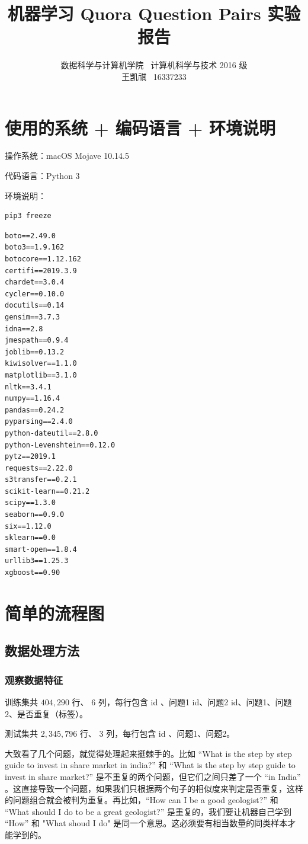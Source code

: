 \documentclass{article}
\begin{document}
\title{机器学习 Quora Question Pairs 实验报告}
\author {数据科学与计算机学院 \ 计算机科学与技术 2016 级 \\ 王凯祺 \ 16337233}
\maketitle

\section{使用的系统 + 编码语言 + 环境说明}

操作系统：macOS Mojave 10.14.5

代码语言：Python 3

环境说明：

\begin{lstlisting}[language=bash]
pip3 freeze
\end{lstlisting}

\begin{lstlisting}
boto==2.49.0
boto3==1.9.162
botocore==1.12.162
certifi==2019.3.9
chardet==3.0.4
cycler==0.10.0
docutils==0.14
gensim==3.7.3
idna==2.8
jmespath==0.9.4
joblib==0.13.2
kiwisolver==1.1.0
matplotlib==3.1.0
nltk==3.4.1
numpy==1.16.4
pandas==0.24.2
pyparsing==2.4.0
python-dateutil==2.8.0
python-Levenshtein==0.12.0
pytz==2019.1
requests==2.22.0
s3transfer==0.2.1
scikit-learn==0.21.2
scipy==1.3.0
seaborn==0.9.0
six==1.12.0
sklearn==0.0
smart-open==1.8.4
urllib3==1.25.3
xgboost==0.90
\end{lstlisting}

\section{简单的流程图}

\subsection{数据处理方法}

\subsubsection{观察数据特征}

训练集共 $404,290$ 行、 $6$ 列，每行包含 id 、问题1 id、问题2 id、问题1、问题2、是否重复（标签）。

测试集共 $2,345,796$ 行、 $3$ 列，每行包含 id 、问题1、问题2。

大致看了几个问题，就觉得处理起来挺棘手的。比如 “What is the step by step guide to invest in share market in india?” 和 “What is the step by step guide to invest in share market?” 是不重复的两个问题，但它们之间只差了一个 “in India” 。这直接导致一个问题，如果我们只根据两个句子的相似度来判定是否重复，这样的问题组合就会被判为重复。再比如，“How can I be a good geologist?” 和 “What should I do to be a great geologist?” 是重复的，我们要让机器自己学到 “How” 和 "What shoud I do" 是同一个意思。这必须要有相当数量的同类样本才能学到的。
\end{document}
